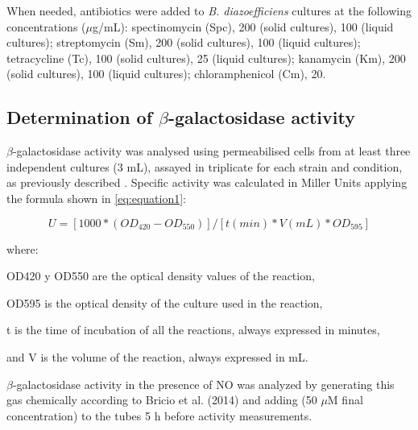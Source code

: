 \documentclass[a4paper,11pt]{article}
\begin{document}
When needed, antibiotics were added to {\em B. diazoefficiens} cultures at the following
concentrations ($\mu$g/mL): spectinomycin (Spc), 200 (solid cultures), 100 (liquid cultures);
streptomycin (Sm), 200 (solid cultures), 100 (liquid cultures); tetracycline (Tc), 100 (solid
cultures), 25 (liquid cultures); kanamycin (Km), 200 (solid cultures), 100 (liquid cultures);
chloramphenicol (Cm), 20.

\subsection{Determination of $\beta$-galactosidase activity}
$\beta$-galactosidase activity was analysed using permeabilised cells from at least three
independent cultures (3 mL), assayed in triplicate for each strain and condition, as previously
described \cite{cabrera2016integrated}. Specific activity was calculated in Miller Units \cite{miller1972miller} applying the formula shown in \ref{eq:equation1}:

\begin{equation}
\label{eq:equation1}
U=[1000*(OD_{420}-OD_{550})]/[t(min)*V(mL)*OD_{595}]
\end{equation}

where:

OD420 y OD550 are the optical density values of the reaction,

OD595 is the optical density of the culture used in the reaction,

t is the time of incubation of all the reactions, always expressed in minutes,

and V is the volume of the reaction, always expressed in mL.


$\beta$-galactosidase activity in the presence of NO was analyzed by generating this gas chemically according
to Bricio et al. (2014) \cite{bricio2014third} and adding (50 $\mu$M final concentration) to the tubes 5 h before
activity measurements.
\end{document}
